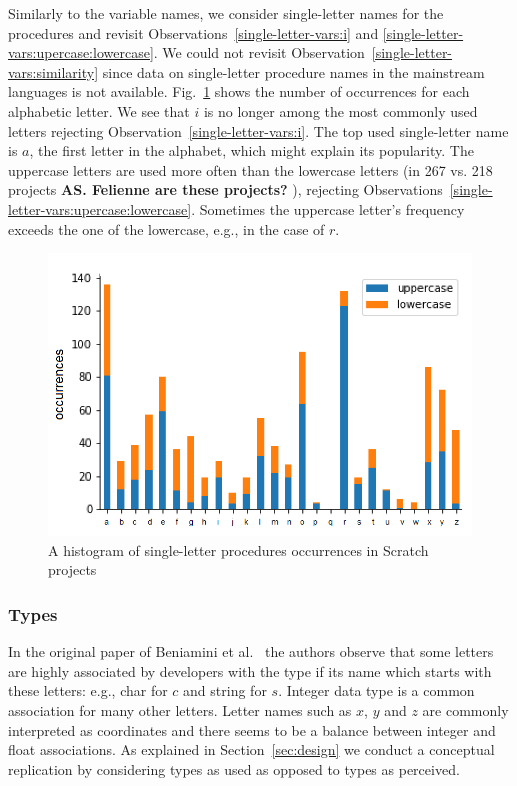 \documentclass[conference]{IEEEtran}
\newcommand{\todo}[1]{ \textbf{#1} }
\begin{document}
Similarly to the variable names, we consider single-letter names for the procedures and revisit Observations~\ref{single-letter-vars:i} and \ref{single-letter-vars:upercase:lowercase}. 
We could not revisit Observation~\ref{single-letter-vars:similarity} since data on single-letter procedure names in the mainstream languages is not available.
Fig.~\ref{fig:one_letter_occurrence_procedures} shows the number of occurrences for each alphabetic letter. 
We see that $i$ is no longer among the most commonly used letters rejecting Observation~\ref{single-letter-vars:i}.
The top used single-letter name is $a$, the first letter in the alphabet, which might explain its popularity.
The uppercase letters are used more often than the lowercase letters (in 267 vs. 218 projects \todo{AS. Felienne are these projects?}), rejecting Observations~\ref{single-letter-vars:upercase:lowercase}.
Sometimes the uppercase letter's frequency exceeds the one of the lowercase, e.g., in the case of $r$. 


\begin{figure}
	\begin{center}
		\includegraphics[width=\columnwidth]{fig/funcname_singleletter-occurrences}
		\caption{A histogram of single-letter procedures occurrences in Scratch projects}
		\label{fig:one_letter_occurrence_procedures}
	\end{center}
\end{figure} 

\subsubsection{Types}
\label{res:types}

In the original paper of Beniamini et al.~\cite{Beniamini} the authors observe that some letters are highly associated by developers with the type if its name which starts with these letters: e.g., char for $c$ and string for $s$. 
Integer data type is a common association for many other letters.
Letter names such as $x$, $y$ and $z$ are commonly interpreted as coordinates and there seems to be a balance between integer and float associations. 
As explained in Section~\ref{sec:design} we conduct a conceptual replication by considering types as used as opposed to types as perceived.
\end{document}
